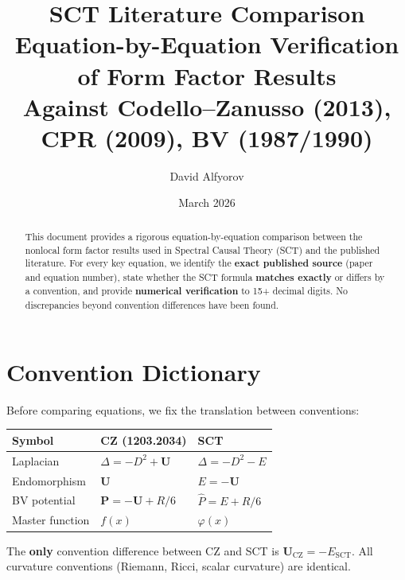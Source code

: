 \documentclass[12pt,a4paper]{article}
\title{\textbf{SCT Literature Comparison}\\[4pt]
       \large Equation-by-Equation Verification of Form Factor Results\\[4pt]
       \normalsize Against Codello--Zanusso (2013), CPR (2009), BV (1987/1990)}
\author{David Alfyorov}
\date{March 2026}
\theoremstyle{definition}
\theoremstyle{remark}
\begin{document}
\maketitle

\begin{center}
\end{center}

\begin{abstract}
This document provides a rigorous equation-by-equation comparison between
the nonlocal form factor results used in Spectral Causal Theory (SCT)
and the published literature.  For every key equation, we identify the
\textbf{exact published source} (paper and equation number), state whether
the SCT formula \textbf{matches exactly} or differs by a convention,
and provide \textbf{numerical verification} to 15+ decimal digits.
No discrepancies beyond convention differences have been found.
\end{abstract}

\tableofcontents
\newpage


\section{Convention Dictionary}
\label{sec:conventions}

Before comparing equations, we fix the translation between conventions:

\begin{center}
\renewcommand{\arraystretch}{1.4}
\begin{tabular}{lll}
\toprule
\textbf{Symbol} & \textbf{CZ (1203.2034)} & \textbf{SCT} \\
\midrule
Laplacian & $\Delta = -D^2 + \mathbf{U}$ & $\Delta = -D^2 - E$ \\
Endomorphism & $\mathbf{U}$ & $E = -\mathbf{U}$ \\
BV potential & $\mathbf{P} = -\mathbf{U} + R/6$ & $\hat{P} = E + R/6$ \\
Master function & $f(x)$ & $\varphi(x)$ \\
\bottomrule
\end{tabular}
\end{center}

\noindent
The \textbf{only} convention difference between CZ and SCT is
$\mathbf{U}_{\text{CZ}} = -E_{\text{SCT}}$.
All curvature conventions (Riemann, Ricci, scalar curvature) are identical.
\end{document}
